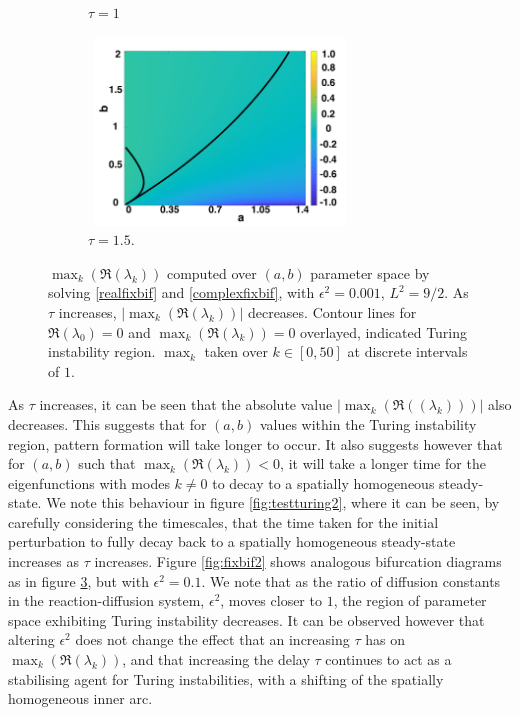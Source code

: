 \begin{figure}[H]
\begin{subfigure}[b]{0.45\textwidth}
        \caption{$\tau=1$}
        \label{}
    \end{subfigure}
    \hfill
    \begin{subfigure}[b]{0.45\textwidth}
        \centering
        \includegraphics[width=7cm,height=5cm]{tau15bif.png}
        \caption{$\tau=1.5$.}
        \label{}
    \end{subfigure}
    \caption{$\max_k(\Re(\lambda_k))$ computed over $(a,b)$ parameter space by solving \eqref{realfixbif} and \eqref{complexfixbif}, with $\epsilon^2=0.001$, $L^2=9/2$. As $\tau$ increases, $|\max_k(\Re(\lambda_k))|$ decreases. Contour lines for $\Re(\lambda_0)=0$ and $\max_k(\Re(\lambda_k))=0$ overlayed, indicated Turing instability region. $\max_k$ taken over $k\in[0, 50]$ at discrete intervals of $1$.}
    \label{fig:lambdavary}
\end{figure}
As $\tau$ increases, it can be seen that the absolute value $|\max_k(\Re((\lambda_k)))|$ also decreases. This suggests that for $(a,b)$ values within the Turing instability region, pattern formation will take longer to occur. It also suggests however that for $(a,b)$ such that $\max_k(\Re(\lambda_k))<0$, it will take a longer time for the eigenfunctions with modes $k\neq0$ to decay to a spatially homogeneous steady-state. We note this behaviour in figure \ref{fig:testturing2}, where it can be seen, by carefully considering the timescales, that the time taken for the initial perturbation to fully decay back to a spatially homogeneous steady-state increases as $\tau$ increases. Figure \ref{fig:fixbif2} shows analogous bifurcation diagrams as in figure \ref{fig:lambdavary}, but with $\epsilon^2=0.1$. We note that as the ratio of diffusion constants in the reaction-diffusion system, $\epsilon^2$, moves closer to $1$, the region of parameter space exhibiting Turing instability decreases. It can be observed however that altering $\epsilon^2$ does not change the effect that an increasing $\tau$ has on $\max_k(\Re(\lambda_k))$, and that increasing the delay $\tau$ continues to act as a stabilising agent for Turing instabilities, with a shifting of the spatially homogeneous inner arc.

